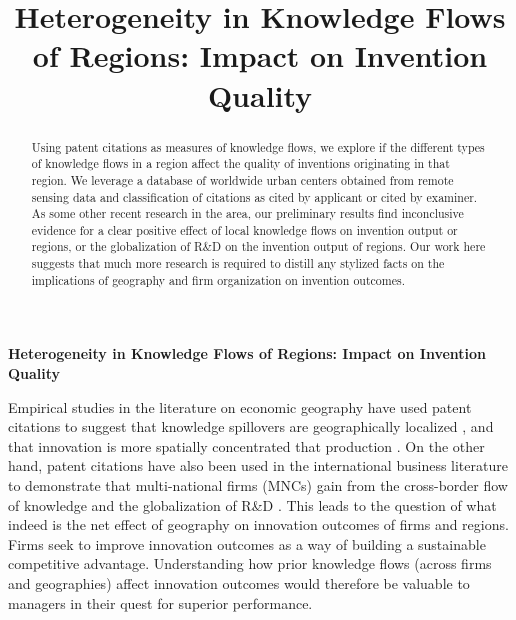 \documentclass[12pt,letterpaper]{article}
\begin{document}
\setlength{\droptitle}{-5em}
\title{\textbf{\large Heterogeneity in Knowledge Flows of Regions: Impact on Invention Quality}}
\date{\vspace{-12ex}}

\maketitle
\thispagestyle{empty}
\renewcommand{\abstractname}{\normalsize ABSTRACT}
\begin{abstract}
\normalsize
\noindent Using patent citations as measures of knowledge flows, we explore if the different types of knowledge flows in a region affect the quality of inventions originating in that region. We leverage a database of worldwide urban centers  obtained from remote sensing data and classification of citations as cited by applicant or cited by examiner. As some other recent research in the area, our preliminary results find inconclusive evidence for a clear positive effect of local knowledge flows on invention output or regions, or the globalization of R\&D on the invention output of regions. Our work here suggests that much more research is required to distill any stylized facts on the implications of geography and firm organization on invention outcomes. 
\end{abstract}

\newpage
\pagestyle{fancy}
\fancyhf{}
\rhead{\thepage}

\textbf{Heterogeneity in Knowledge Flows of Regions: Impact on Invention Quality}

\vspace{3ex}


\noindent Empirical studies in the literature on economic geography have used patent citations to suggest that knowledge spillovers are geographically localized \citep*{Jaffe1993, Almeida1999, Bottazzi2003, Branstetter2001, Maurseth2002, Sonn2008}, and that innovation is more spatially concentrated that production \citep{Feldman1994a}. On the other hand, patent citations have also been used in the international business literature to demonstrate that multi-national firms (MNCs) gain from the cross-border flow of knowledge and the globalization of R\&D \citep{Singh2007, Zhao2006, Singh2013}. This leads to the question of what indeed is the net effect of geography on innovation outcomes of firms and regions. Firms seek to improve innovation outcomes as a way of building a sustainable competitive advantage. Understanding how prior knowledge flows (across firms and geographies) affect innovation outcomes would therefore be valuable to managers in their quest for superior performance. \par
\end{document}
